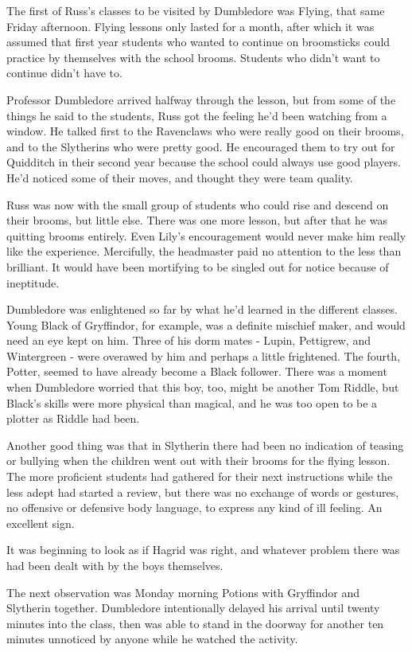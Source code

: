 \documentclass[a4paper,11pt]{article}
\begin{document}
The first of Russ's classes to be visited by Dumbledore was Flying, that same Friday afternoon. Flying lessons only lasted for a month, after which it was assumed that first year students who wanted to continue on broomsticks could practice by themselves with the school brooms. Students who didn't want to continue didn't have to.

Professor Dumbledore arrived halfway through the lesson, but from some of the things he said to the students, Russ got the feeling he'd been watching from a window. He talked first to the Ravenclaws who were really good on their brooms, and to the Slytherins who were pretty good. He encouraged them to try out for Quidditch in their second year because the school could always use good players. He'd noticed some of their moves, and thought they were team quality.

Russ was now with the small group of students who could rise and descend on their brooms, but little else. There was one more lesson, but after that he was quitting brooms entirely. Even Lily's encouragement would never make him really like the experience. Mercifully, the headmaster paid no attention to the less than brilliant. It would have been mortifying to be singled out for notice because of ineptitude.

Dumbledore was enlightened so far by what he'd learned in the different classes. Young Black of Gryffindor, for example, was a definite mischief maker, and would need an eye kept on him. Three of his dorm mates - Lupin, Pettigrew, and Wintergreen - were overawed by him and perhaps a little frightened. The fourth, Potter, seemed to have already become a Black follower. There was a moment when Dumbledore worried that this boy, too, might be another Tom Riddle, but Black's skills were more physical than magical, and he was too open to be a plotter as Riddle had been.

Another good thing was that in Slytherin there had been no indication of teasing or bullying when the children went out with their brooms for the flying lesson. The more proficient students had gathered for their next instructions while the less adept had started a review, but there was no exchange of words or gestures, no offensive or defensive body language, to express any kind of ill feeling. An excellent sign.

It was beginning to look as if Hagrid was right, and whatever problem there was had been dealt with by the boys themselves.

The next observation was Monday morning Potions with Gryffindor and Slytherin together. Dumbledore intentionally delayed his arrival until twenty minutes into the class, then was able to stand in the doorway for another ten minutes unnoticed by anyone while he watched the activity.
\end{document}
